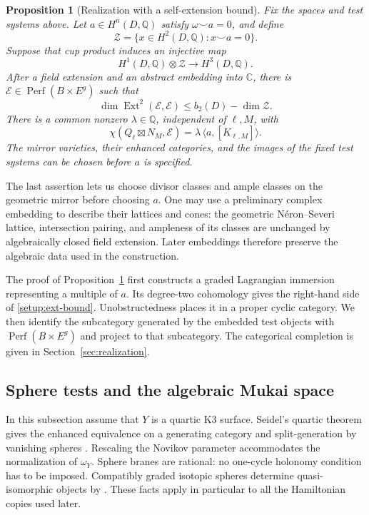 \documentclass[11pt]{article}
\numberwithin{equation}{section}
\newtheorem{proposition}[theorem]{Proposition}
\theoremstyle{definition}
\theoremstyle{remark}
\newcommand{\Q}{\mathbb Q}
\newcommand{\C}{\mathbb C}
\DeclareMathOperator{\Ext}{Ext}
\DeclareMathOperator{\Perf}{Perf}
\begin{document}
\begin{proposition}[Realization with a self-extension bound]
\label{prop:realization}
Fix the spaces and test systems above.  Let $a\in H^n(D,\Q)$ satisfy
$\omega\smile a=0$, and define
\[
 \mathcal Z=\{x\in H^2(D,\Q):x\smile a=0\}.
\]
Suppose that cup product induces an injective map
\begin{equation}
 H^1(D,\Q)\otimes\mathcal Z\longrightarrow H^3(D,\Q).
 \label{setup:wedge-injective}
\end{equation}
After a field extension and an abstract embedding into $\C$, there is
$\mathcal E\in\Perf(B\times E^g)$ such that
\begin{equation}
 \dim\Ext^2(\mathcal E,\mathcal E)
 \le b_2(D)-\dim\mathcal Z.
 \label{setup:ext-bound}
\end{equation}
There is a common nonzero $\lambda\in\Q$, independent of $\ell,M$, with
\begin{equation}
 \chi(Q_\ell\boxtimes N_M,\mathcal E)
   =\lambda\,\langle a,[K_{\ell,M}]\rangle.
 \label{setup:euler}
\end{equation}
The mirror varieties, their enhanced categories, and the images of the
fixed test systems can be chosen before $a$ is specified.
\end{proposition}

The last assertion lets us choose divisor classes and ample classes on
the geometric mirror before choosing $a$.  One may use a preliminary
complex embedding to describe their lattices and cones: the geometric
N\'eron--Severi lattice, intersection pairing, and ampleness of its
classes are unchanged by algebraically closed field extension.  Later
embeddings therefore preserve the algebraic data used in the
construction.

The proof of Proposition~\ref{prop:realization} first constructs a graded
Lagrangian immersion representing a multiple of $a$.  Its degree-two
cohomology gives the right-hand side of \eqref{setup:ext-bound}.
Unobstructedness places it in a proper cyclic category.  We then identify
the subcategory generated by the embedded test objects with
$\Perf(B\times E^g)$ and project to that subcategory.  The categorical
completion is given in Section~\ref{sec:realization}.

\subsection{Sphere tests and the algebraic Mukai space}

In this subsection assume that $Y$ is a quartic K3 surface.
Seidel's quartic theorem gives the enhanced equivalence on a generating
category and split-generation by vanishing spheres
\cite[Theorem~1.3, Corollary~9.6, and Lemma~11.4]{SeidelQuartic}.
Rescaling the Novikov parameter accommodates the normalization of
$\omega_Y$.  Sphere branes are rational: no one-cycle holonomy condition
has to be imposed.  Compatibly graded isotopic spheres determine
quasi-isomorphic objects by \cite[Lemma~8.14]{SeidelQuartic}.  These facts
apply in particular to all the Hamiltonian copies used later.
\end{document}
